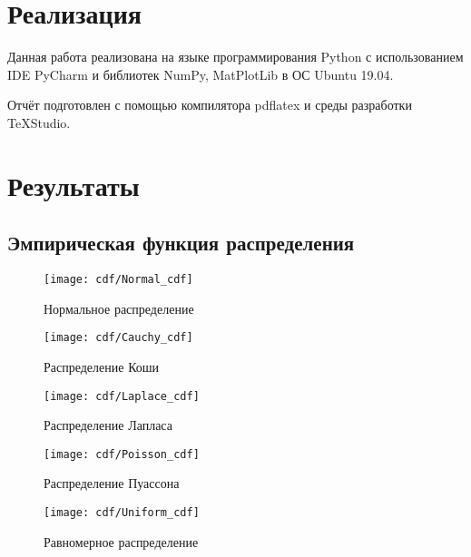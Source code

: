 \section{Реализация}
Данная работа реализована на языке программирования Python с использованием IDE PyCharm и библиотек NumPy, MatPlotLib в ОС Ubuntu 19.04.

Отчёт подготовлен с помощью компилятора pdflatex и среды разработки TeXStudio.

\section{Результаты}
\subsection{Эмпирическая функция распределения}

\begin{figure}[H]
	\begin{center}
		\texttt{[image: cdf/Normal\_cdf]}
		\caption{Нормальное распределение} 
		\label{pic:pic_name} 
	\end{center}
\end{figure}

\begin{figure}[H]
	\begin{center}
		\texttt{[image: cdf/Cauchy\_cdf]}
		\caption{Распределение Коши} 
		\label{pic:pic_name} 
	\end{center}
\end{figure}

\begin{figure}[H]
	\begin{center}
		\texttt{[image: cdf/Laplace\_cdf]}
		\caption{Распределение Лапласа} 
		\label{pic:pic_name} 
	\end{center}
\end{figure}

\begin{figure}[H]
	\begin{center}
		\texttt{[image: cdf/Poisson\_cdf]}
		\caption{Распределение Пуассона} 
		\label{pic:pic_name} 
	\end{center}
\end{figure}

\begin{figure}[H]
	\begin{center}
		\texttt{[image: cdf/Uniform\_cdf]}
		\caption{Равномерное распределение} 
		\label{pic:pic_name} 
	\end{center}
\end{figure}


